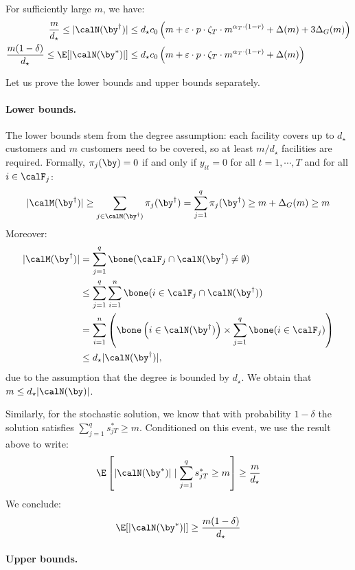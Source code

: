 \documentclass[blindrev]{informs3noheader}
\begin{document}
\begin{lemma}\label{lem:sol_bound}
For sufficiently large $m$, we have:
\begin{align*}
    \frac{m}{d_\star} \leq |\calN(\by^\dagger)|&\leq  d_\star c_0\left(m + \varepsilon\cdot p \cdot \zeta_T\cdot m^{\alpha_T\cdot(1-r)} +\Delta(m)+3\Delta_G(m)\right)\\
    \frac{m(1-\delta)}{d_\star} \leq \E[|\calN(\by^*)|]&\leq   d_\star c_0\left(m + \varepsilon\cdot p \cdot \zeta_T\cdot m^{\alpha_T\cdot(1-r)} + \Delta(m)\right)      
\end{align*}
\end{lemma}

 Let us prove the lower bounds and upper bounds separately.

\paragraph{Lower bounds.}

The lower bounds stem from the degree assumption: each facility covers up to $d_\star$ customers and $m$ customers need to be covered, so at least $m/d_\star$ facilities are required. Formally, $\pi_{j}(\by)=0$ if and only if $y_{it}=0$ for all $t=1,\cdots,T$ and for all $i\in\calF_j$:
$$|\calM(\by^\dagger)|\geq\sum_{j\in\calM(\by^\dagger)}\pi_{j}(\by^\dagger)=\sum_{j=1}^q \pi_{j}(\by^\dagger) \geq m+\Delta_G(m)\geq m$$
Moreover:
\begin{align*}
|\calM(\by^\dagger)|
&=\sum_{j=1}^q\bone(\calF_j\cap\calN(\by^\dagger)\neq\emptyset)\\
&\leq \sum_{j=1}^q\sum_{i=1}^n\bone(i\in\calF_j\cap\calN(\by^\dagger))\\
&=\sum_{i=1}^n\left(\bone\left(i\in\calN(\by^\dagger)\right)\times\sum_{j=1}^q\bone(i\in\calF_j)\right)\\
&\leq d_\star|\calN(\by^\dagger)|,
\end{align*}
due to the assumption that the degree is bounded by $d_\star$. We obtain that
$m\leq d_\star|\calN(\by)|$.

Similarly, for the stochastic solution, we know that with probability $1-\delta$ the solution satisfies $\sum_{j=1}^q s^*_{jT} \geq m$. Conditioned on this event, we use the result above to write:
\[\E\left[|\calN(\by^*)| \mid \sum_{j=1}^q s^*_{jT} \geq m\right] \geq \frac{m}{d_\star}\]
We conclude:
\[\E[|\calN(\by^*)|] \geq \frac{m(1-\delta)}{d_\star}\]

\paragraph{Upper bounds.}
\end{document}
